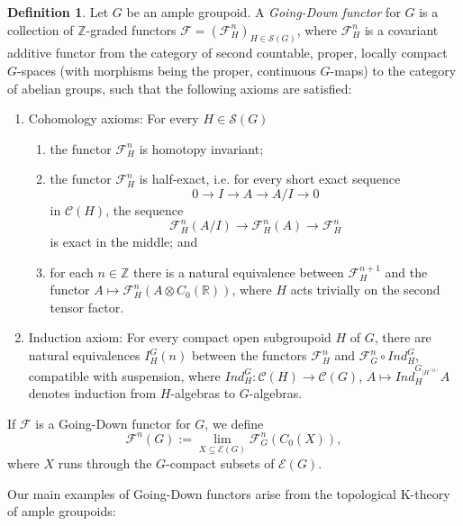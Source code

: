 \documentclass[reqno,oneside,a4paper,11pt]{amsart}
\theoremstyle{theorem}
\theoremstyle{definition}
\newtheorem{defi}[satz]{Definition}
\newcommand{\K}{\mathrm K}
\newcommand{\RR}{\mathbb R}
\newcommand{\ZZ}{\mathbb Z}
\begin{document}
	\begin{defi}\label{Def:GDfunctor} Let $G$ be an ample groupoid.
		A \textit{Going-Down functor} for $G$ is a collection of $\ZZ$-graded functors $\mathcal{F}=(\mathcal{F}^n_H)_{H\in \mathcal{S}(G)}$, where $\mathcal{F}^n_{H}$ is a covariant additive functor from the category of second countable, proper, locally compact $G$-spaces (with morphisms being the proper, continuous $G$-maps) to the category of abelian groups, such that the following axioms are satisfied:
		\begin{enumerate}
			\item Cohomology axioms: For every $H\in \mathcal{S}(G)$
			\begin{enumerate}
				\item the functor $\mathcal{F}_H^n$ is homotopy invariant;
				\item the functor $\mathcal{F}_H^n$ is half-exact, i.e. for every short exact sequence $$0\longrightarrow I\longrightarrow A\longrightarrow A/I\longrightarrow 0$$
				in $\mathcal{C}(H)$, the sequence
				$$\mathcal{F}_H^n (A/I)\longrightarrow \mathcal{F}_H^n(A)\longrightarrow\mathcal{F}_H^n$$
				is exact in the middle; and 
				\item for each $n\in\ZZ$ there is a natural equivalence between $\mathcal{F}_H^{n+1}$ and the functor $A\mapsto \mathcal{F}_H^n(A\otimes C_0(\RR))$, where $H$ acts trivially on the second tensor factor.
			\end{enumerate}
			\item Induction axiom: For every compact open subgroupoid $H$ of $G$, there are natural equivalences $I_H^G(n)$ between the functors $\mathcal{F}_H^n$ and $\mathcal{F}_G^n\circ Ind_H^G$, compatible with suspension,
			where $Ind_H^G:\mathcal{C}(H)\rightarrow \mathcal{C}(G)$, $A\mapsto Ind_H^{G_{\mid H^{(0)}}} A$ denotes induction from $H$-algebras to $G$-algebras.
		\end{enumerate}
		If $\mathcal{F}$ is a Going-Down functor for $G$, we define $$\mathcal{F}^n(G):=\lim\limits_{X\subseteq \mathcal{E}(G)}\mathcal{F}^n_G(C_0(X)),$$
		where $X$ runs through the $G$-compact subsets of $\mathcal{E}(G)$.
	\end{defi}
	Our main examples of Going-Down functors arise from the topological $\K$-theory of ample groupoids:
\end{document}
